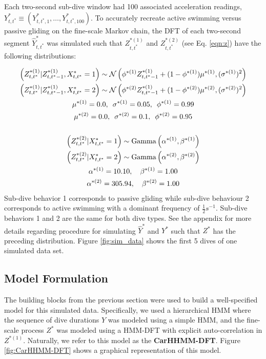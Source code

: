 Each two-second sub-dive window had 100 associated acceleration readings, $Y^*_{t,t^*} \equiv \left(Y^*_{t,t^*,1}, \ldots, Y^*_{t,t^*,100}\right)$. To accurately recreate active swimming versus passive gliding on the fine-scale Markov chain, the DFT of each two-second segment $\hat Y^*_{t,t^*}$ was simulated such that $Z^{*(1)}_{t,t^*}$ and $Z^{*(2)}_{t,t^*}$ (see Eq. \ref{eqn:z}) have the following distributions: 

\begin{gather*}
    \left(Z^{*(1)}_{t,t^*} | Z^{*(1)}_{t,t^*-1}, X^*_{t,t^*} = 1 \right) \sim \mathcal{N} \left(\phi^{*(1)}Z^{*(1)}_{t,t^*-1} + (1-\phi^{*(1)})\mu^{*(1)}, (\sigma^{*(1)})^2 \right) \\
    \left(Z^{*(1)}_{t,t^*} | Z^{*(1)}_{t,t^*-1}, X^*_{t,t^*} = 2 \right) \sim \mathcal{N} \left(\phi^{*(2)}Z^{*(1)}_{t,t^*-1} + (1-\phi^{*(2)})\mu^{*(2)}, (\sigma^{*(2)})^2 \right) \\
    \mu^{*(1)} = 0.0,\enspace \sigma^{*(1)} = 0.05,\enspace \phi^{*(1)} = 0.99 \\
    \mu^{*(2)} = 0.0,\enspace \sigma^{*(2)} = 0.1,\enspace \phi^{*(2)} = 0.95 \\\\
    \left(Z^{*(2)}_{t,t^*} | X^*_{t,t^*} = 1\right) \sim {\rm{Gamma}}\left(\alpha^{*(1)}, \beta^{*(1)} \right) \\
    \left(Z^{*(2)}_{t,t^*} | X^*_{t,t^*} = 2\right) \sim {\rm{Gamma}}\left(\alpha^{*(2)}, \beta^{*(2)} \right) \\
    \alpha^{*(1)} = 10.10, \enspace \enspace \beta^{*(1)} = 1.00 \\
    \alpha^{*(2)} = 305.94, \enspace \enspace \beta^{*(2)} = 1.00
\end{gather*}
%
Sub-dive behavior 1 corresponds to passive gliding while sub-dive behaviour 2 corresponds to active swimming with a dominant frequency of $\frac{1}{2}s^{-1}$. Sub-dive behaviors 1 and 2 are the same for both dive types. See the appendix for more details regarding procedure for simulating $\hat Y^*$ and $Y^*$ such that $Z^*$ has the preceding distribution. Figure \ref{fig:sim_data} shows the first 5 dives of one simulated data set.

\subsection{Model Formulation}
\label{subsec:model_structure}

The building blocks from the previous section were used to build a well-specified model for this simulated data. Specifically, we used a hierarchical HMM where the sequence of dive durations $Y$ was modeled using a simple HMM, and the fine-scale process $Z^*$ was modeled using a HMM-DFT with explicit auto-correlation in $Z^{*(1)}$. Naturally, we refer to this model as the \textbf{CarHHMM-DFT}. Figure \ref{fig:CarHHMM-DFT} shows a graphical representation of this model. 

